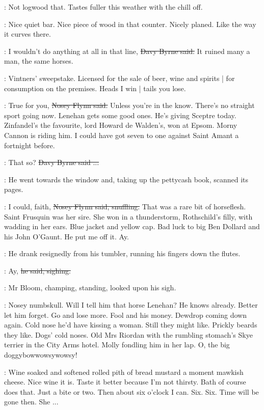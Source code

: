 \BloomInt:
Not logwood that.
Tastes fuller this weather with the chill off.

\BloomInt:
Nice quiet bar.
Nice piece of wood in that counter.
Nicely planed.
Like the way it curves there.

\davybyrne:
I wouldn't do anything at all in that line,
\sout{Davy Byrne said.}
It ruined many a man,
the same horses.

\BloomInt:
Vintners' sweepstake.
Licensed for the sale of beer, wine and spirits |
for consumption on the premises.
Heads I win |
tails you lose.

\nosey:
True for you,
\sout{Nosey Flynn said.}
Unless you're in the know.
There's no straight sport going now.
Lenehan gets some good ones.
He's giving Sceptre today.
Zinfandel's the favourite,
lord Howard de Walden's,
won at Epsom.
Morny Cannon is riding him.
I could have got seven to one against Saint Amant a fortnight before.

\davybyrne:
That so?
\sout{Davy Byrne said ...}

:
He went towards the window and,
taking up the pettycash book,
scanned its pages.

\nosey:
I could, faith,
\sout{Nosey Flynn said, snuffling.}
That was a rare bit of horseflesh.
Saint Frusquin was her sire.
She won in a thunderstorm,
Rothschild's filly,
with wadding in her ears.
Blue jacket and yellow cap.
Bad luck to big Ben Dollard and his John O'Gaunt.
He put me off it.
Ay.

:
He drank resignedly from his tumbler,
running his fingers down the flutes.

\nosey:
Ay,
\sout{he said, sighing.}

:
Mr Bloom,
champing, standing,
looked upon his sigh.

\BloomInt:
Nosey numbskull.
Will I tell him that horse Lenehan?
He knows already.
Better let him forget.
Go and lose more.
Fool and his money.
Dewdrop coming down again.
Cold nose he'd have kissing a woman.
Still they might like.
Prickly beards they like.
Dogs' cold noses.
Old Mrs Riordan with the rumbling stomach's Skye terrier in the City Arms hotel.
Molly fondling him in her lap.
O, the big doggybowwowsywowsy!

\BloomInt:
Wine soaked and softened rolled pith of bread
mustard a moment
mawkish cheese.
Nice wine it is.
Taste it better because I'm not thirsty.
Bath of course does that.
Just a bite or two.
Then about six o'clock I can.
Six.
Six.
Time will be gone then.
She ...


